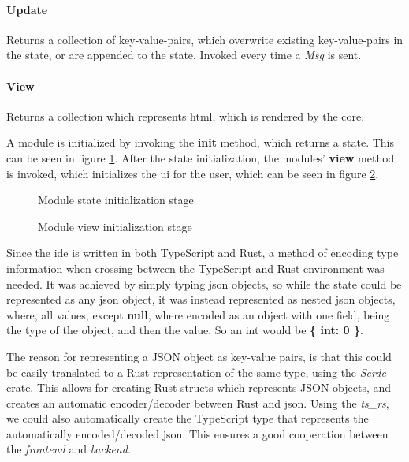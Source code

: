 \paragraph{Update} Returns a collection of key-value-pairs, which
overwrite existing key-value-pairs in the state, or are appended to the state.
Invoked every time a \textit{Msg} is sent.

\paragraph{View} Returns a collection which represents \gls{html},
which is rendered by the core.

A module is initialized by invoking the \textbf{init} method, which returns a
state. This can be seen in figure \ref{fig:moduleInit}. After the state
initialization, the modules' \textbf{view} method is invoked, which initializes
the \gls{ui} for the user, which can be seen in figure \ref{fig:moduleInitView}.

\begin{figure}
  \centering
  
  \caption{Module state initialization stage}
  \label{fig:moduleInit}
\end{figure}

\begin{figure}
  \centering
  
  \caption{Module view initialization stage}
  \label{fig:moduleInitView}
\end{figure}

Since the \gls{ide} is written in both TypeScript and Rust, a method of encoding
type information when crossing between the TypeScript and Rust environment was
needed. It was achieved by simply typing \gls{json} objects, so while the state
could be represented as any \gls{json} object, it was instead represented as
nested \gls{json} objects, where, all values, except \textbf{null}, where
encoded as an object with one field, being the type of the object, and then the
value. So an int would be \textbf{\{ int: 0 \}}.

The reason for representing a JSON object as key-value pairs, is that this could
be easily translated to a Rust representation of the same type, using the
\textit{Serde} crate. This allows for creating Rust structs which represents
JSON objects, and creates an automatic encoder/decoder between Rust and
\gls{json}. Using the \textit{ts\_rs}, we could also automatically create the
TypeScript type that represents the automatically encoded/decoded \gls{json}.
This ensures a good cooperation between the \textit{frontend} and
\textit{backend}.

